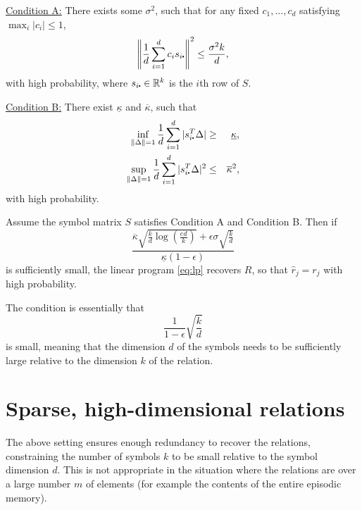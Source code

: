 \underline{Condition A:}
  There exists some $\sigma^2$, such that for any fixed $c_1,...,c_d$ satisfying $\max_i|c_i|\leq 1$,
  \begin{equation}
    \left\|\frac{1}{d}\sum_{i=1}^d c_i s_{i\rdot} \right\|^2\leq \frac{\sigma^2 k}{d},
  \end{equation}
with high probability, where $s_{i\rdot}\in\reals^k$ is the $i$th row of $S$.
  
\underline{Condition B:}
  There exist $\underline{\kappa}$ and $\overline{\kappa}$, such that
  \begin{eqnarray}
  \label{eq:l1-upper-A} \inf_{\|\Delta\|=1}\frac{1}{d}\sum_{i=1}^d|s_{i\rdot}^T\Delta| &\geq& \underline{\kappa}, \\
  \label{eq:l2-upper-A} \sup_{\|\Delta\|=1}\frac{1}{d}\sum_{i=1}^d|s_{i\rdot}^T\Delta|^2 &\leq& \overline{\kappa}^2,
  \end{eqnarray}
  with high probability.

\begin{thm}\label{thm:main-improved}
  Assume the symbol matrix $S$ satisfies Condition A and Condition B. Then if
  \begin{equation}
  \frac{\overline{\kappa}\sqrt{\frac{k}{d}\log\left(\frac{e d}{k}\right)}+\epsilon\sigma\sqrt{\frac{k}{d}}}{\underline{\kappa}(1-\epsilon)}
  \end{equation}
  is sufficiently small, the linear program \eqref{eq:lp} recovers $R$, so that $\hat r_j = r_j$ with high probability.
  \end{thm}

The condition is essentially that 
  \begin{equation}
    \frac{1}{1-\epsilon} \sqrt{\frac{k}{d}}
  \end{equation}
  is small, meaning that the dimension $d$ of the symbols needs to be sufficiently large relative 
  to the dimension $k$ of the relation.

  \section{Sparse, high-dimensional relations} 

 The above setting ensures enough redundancy to recover the relations, constraining the number of symbols $k$ to be small relative to the symbol dimension $d$. This is not appropriate in the situation where the relations are over a large number $m$ of elements (for example the contents of the entire episodic memory).

